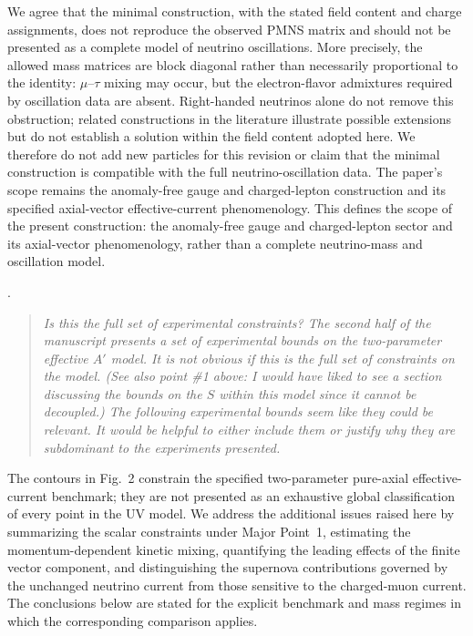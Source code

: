\documentclass[12pt,a4paper]{article}
\begin{document}

We agree that the minimal construction, with the stated field content and charge assignments, does not reproduce the observed PMNS matrix and should not be presented as a complete model of neutrino oscillations. More precisely, the allowed mass matrices are block diagonal rather than necessarily proportional to the identity: \(\mu\)--\(\tau\) mixing may occur, but the electron-flavor admixtures required by oscillation data are absent. Right-handed neutrinos alone do not remove this obstruction; related constructions in the literature illustrate possible extensions but do not establish a solution within the field content adopted here. We therefore do not add new particles for this revision or claim that the minimal construction is compatible with the full neutrino-oscillation data. The paper's scope remains the anomaly-free gauge and charged-lepton construction and its specified axial-vector effective-current phenomenology. This defines the scope of the present construction: the anomaly-free gauge and charged-lepton sector and its axial-vector phenomenology, rather than a complete neutrino-mass and oscillation model.

\medskip
{}.
\begin{quote}\itshape
Is this the full set of experimental constraints? The second half of the manuscript presents a set of experimental bounds on the two-parameter effective \(A'\) model. It is not obvious if this is the full set of constraints on the model. (See also point \#1 above: I would have liked to see a section discussing the bounds on the \(S\) within this model since it cannot be decoupled.) The following experimental bounds seem like they could be relevant. It would be helpful to either include them or justify why they are subdominant to the experiments presented.
\end{quote}


The contours in Fig.~2 constrain the specified two-parameter pure-axial effective-current benchmark; they are not presented as an exhaustive global classification of every point in the UV model. We address the additional issues raised here by summarizing the scalar constraints under Major Point~1, estimating the momentum-dependent kinetic mixing, quantifying the leading effects of the finite vector component, and distinguishing the supernova contributions governed by the unchanged neutrino current from those sensitive to the charged-muon current. The conclusions below are stated for the explicit benchmark and mass regimes in which the corresponding comparison applies.
\end{document}
